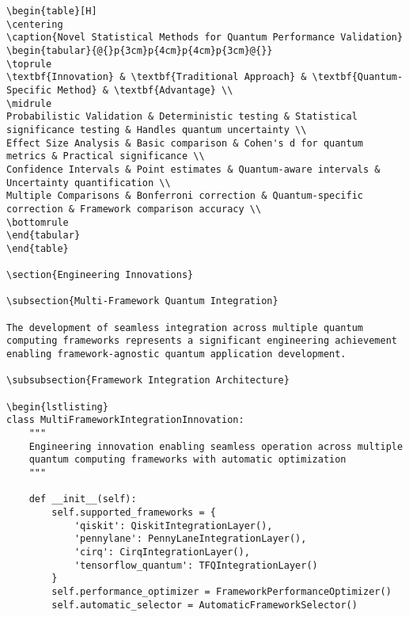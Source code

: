 \documentclass[12pt,a4paper]{report}
\begin{document}
\begin{lstlisting}
\begin{table}[H]
\centering
\caption{Novel Statistical Methods for Quantum Performance Validation}
\begin{tabular}{@{}p{3cm}p{4cm}p{4cm}p{3cm}@{}}
\toprule
\textbf{Innovation} & \textbf{Traditional Approach} & \textbf{Quantum-Specific Method} & \textbf{Advantage} \\
\midrule
Probabilistic Validation & Deterministic testing & Statistical significance testing & Handles quantum uncertainty \\
Effect Size Analysis & Basic comparison & Cohen's d for quantum metrics & Practical significance \\
Confidence Intervals & Point estimates & Quantum-aware intervals & Uncertainty quantification \\
Multiple Comparisons & Bonferroni correction & Quantum-specific correction & Framework comparison accuracy \\
\bottomrule
\end{tabular}
\end{table}

\section{Engineering Innovations}

\subsection{Multi-Framework Quantum Integration}

The development of seamless integration across multiple quantum computing frameworks represents a significant engineering achievement enabling framework-agnostic quantum application development.

\subsubsection{Framework Integration Architecture}

\begin{lstlisting}
class MultiFrameworkIntegrationInnovation:
    """
    Engineering innovation enabling seamless operation across multiple
    quantum computing frameworks with automatic optimization
    """

    def __init__(self):
        self.supported_frameworks = {
            'qiskit': QiskitIntegrationLayer(),
            'pennylane': PennyLaneIntegrationLayer(),
            'cirq': CirqIntegrationLayer(),
            'tensorflow_quantum': TFQIntegrationLayer()
        }
        self.performance_optimizer = FrameworkPerformanceOptimizer()
        self.automatic_selector = AutomaticFrameworkSelector()


\end{lstlisting}
\end{document}
